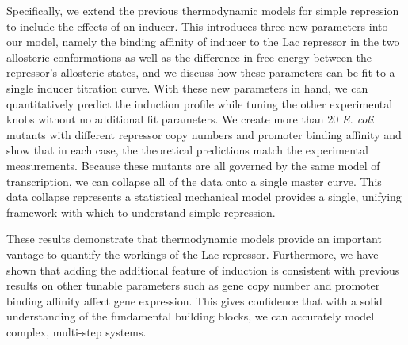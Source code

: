 Specifically, we extend the previous thermodynamic models for simple repression
to include the effects of an inducer. This introduces three new parameters into
our model, namely the binding affinity of inducer to the Lac repressor in the
two allosteric conformations as well as the difference in free energy between
the repressor's allosteric states, and we discuss how these parameters can be
fit to a single inducer titration curve. With these new parameters in hand, we
can quantitatively predict the induction profile while tuning the other
experimental knobs without no additional fit parameters. We create more than 20
\textit{E. coli} mutants with different repressor copy numbers and promoter
binding affinity and show that in each case, the theoretical predictions match
the experimental measurements. Because these mutants are all governed by the
same model of transcription, we can collapse all of the data onto a single
master curve. This data collapse represents a statistical mechanical model
provides a single, unifying framework with which to understand simple
repression.

These results demonstrate that thermodynamic models provide an important vantage
to quantify the workings of the Lac repressor. Furthermore, we have shown that
adding the additional feature of induction is consistent with previous results
on other tunable parameters such as gene copy number and promoter binding
affinity affect gene expression. This gives confidence that with a solid
understanding of the fundamental building blocks, we can accurately model
complex, multi-step systems.